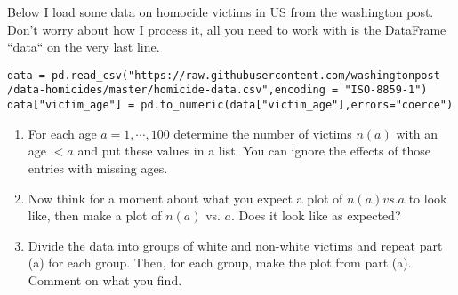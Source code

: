\begin{exercise}\label{ex:washpost}
Below I load some data on homocide victims in US from the washington post. Don't worry about how I process it, all you need to work with is the DataFrame ``data`` on the very last line.

\begin{Verbatim}
data = pd.read_csv("https://raw.githubusercontent.com/washingtonpost
/data-homicides/master/homicide-data.csv",encoding = "ISO-8859-1")
data["victim_age"] = pd.to_numeric(data["victim_age"],errors="coerce")
\end{Verbatim}
%

\begin{enumerate}[label=(\alph*)]
\item  For each age $a = 1,\cdots,100$ determine the number of victims $n(a)$ with an age $<a$ and put these values in a list. You can ignore the effects of those entries with missing ages. 
\item Now think for a moment about what you expect a plot of $n(a) vs. a$ to look like, then make a plot of $n(a)$ vs. $a$. Does it look like as expected?
\item Divide the data into groups of white and non-white victims and repeat part (a) for each group. Then, for each group, make the plot from part (a). Comment on what you find. 
\end{enumerate}
\end{exercise}



